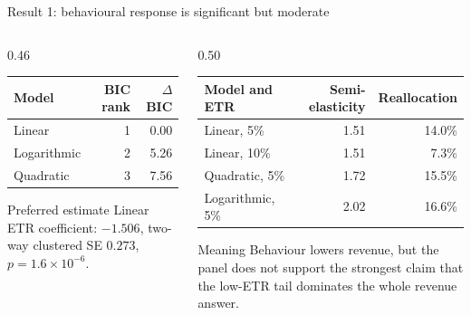 \documentclass[aspectratio=169, 11pt]{beamer}
\begin{document}
\begin{frame}{Result 1: behavioural response is significant but moderate}
\begin{columns}[T]
\begin{column}{0.46\textwidth}
\begin{center}
\scriptsize
\begin{tabular}{@{}lrr@{}}
  \toprule
  Model & BIC rank & $\Delta$BIC \\
  \midrule
  Linear & 1 & 0.00 \\
  Logarithmic & 2 & 5.26 \\
  Quadratic & 3 & 7.56 \\
  \bottomrule
\end{tabular}
\end{center}

\vspace{0.3em}
\begin{block}{Preferred estimate}
  Linear ETR coefficient: $-1.506$, two-way clustered SE $0.273$, $p=1.6\times10^{-6}$.
\end{block}
\end{column}
\begin{column}{0.50\textwidth}
\begin{center}
\scriptsize
\begin{tabular}{@{}lrr@{}}
  \toprule
  Model and ETR & Semi-elasticity & Reallocation \\
  \midrule
  Linear, 5\% & 1.51 & 14.0\% \\
  Linear, 10\% & 1.51 & 7.3\% \\
  Quadratic, 5\% & 1.72 & 15.5\% \\
  Logarithmic, 5\% & 2.02 & 16.6\% \\
  \bottomrule
\end{tabular}
\end{center}

\vspace{0.3em}
\begin{alertblock}{Meaning}
  Behaviour lowers revenue, but the panel does not support the strongest claim that the low-ETR tail dominates the whole revenue answer.
\end{alertblock}
\end{column}
\end{columns}
\end{frame}
\end{document}
